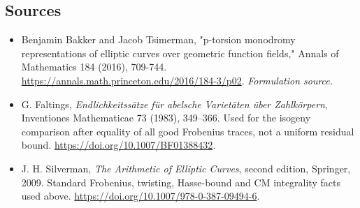 \documentclass[11pt]{article}
\begin{document}
\subsection{Sources}
\begin{itemize}
\item[S1]Benjamin Bakker and Jacob Tsimerman, "p-torsion monodromy representations of elliptic curves over geometric function fields," Annals of Mathematics 184 (2016), 709-744.
\url{https://annals.math.princeton.edu/2016/184-3/p02}.
\textit{Formulation source.}
\item[E1]G. Faltings, \textit{Endlichkeitss\"atze f\"ur abelsche Variet\"aten \"uber Zahlk\"orpern}, Inventiones Mathematicae 73 (1983), 349--366. Used for the isogeny comparison after equality of all good Frobenius traces, not a uniform residual bound.
\url{https://doi.org/10.1007/BF01388432}.
\item[E2]J. H. Silverman, \textit{The Arithmetic of Elliptic Curves}, second edition, Springer, 2009. Standard Frobenius, twisting, Hasse-bound and CM integrality facts used above.
\url{https://doi.org/10.1007/978-0-387-09494-6}.

\end{itemize}
\end{document}
